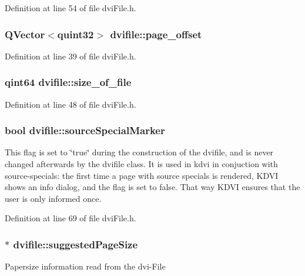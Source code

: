Definition at line 54 of file dvi\+File.\+h.

\hypertarget{classdvifile_aeafc97277647ad5077a774be71b3253a}{
\subsubsection[{page\+\_\+offset}]{\setlength{\rightskip}{0pt plus 5cm}Q\+Vector$<$quint32$>$ dvifile\+::page\+\_\+offset}}\label{classdvifile_aeafc97277647ad5077a774be71b3253a}


Definition at line 39 of file dvi\+File.\+h.

\hypertarget{classdvifile_ac136b96471bfd7873dbcb0425240dd0e}{
\subsubsection[{size\+\_\+of\+\_\+file}]{\setlength{\rightskip}{0pt plus 5cm}qint64 dvifile\+::size\+\_\+of\+\_\+file}}\label{classdvifile_ac136b96471bfd7873dbcb0425240dd0e}


Definition at line 48 of file dvi\+File.\+h.

\hypertarget{classdvifile_a3121bb4c368ca1d30949cffb1df44d81}{
\subsubsection[{source\+Special\+Marker}]{\setlength{\rightskip}{0pt plus 5cm}bool dvifile\+::source\+Special\+Marker}}\label{classdvifile_a3121bb4c368ca1d30949cffb1df44d81}
This flag is set to \char`\"{}true\char`\"{} during the construction of the dvifile, and is never changed afterwards by the dvifile class. It is used in kdvi in conjuction with source-\/specials\+: the first time a page with source specials is rendered, K\+D\+V\+I shows an info dialog, and the flag is set to false. That way K\+D\+V\+I ensures that the user is only informed once. 

Definition at line 69 of file dvi\+File.\+h.

\hypertarget{classdvifile_a9fdbeee20bb39fcafe317925767b24ef}{
\subsubsection[{suggested\+Page\+Size}]{$\ast$ dvifile\+::suggested\+Page\+Size}}\label{classdvifile_a9fdbeee20bb39fcafe317925767b24ef}
Papersize information read from the dvi-\/\+File 


